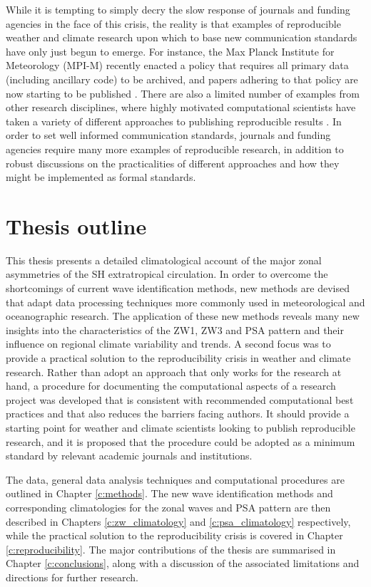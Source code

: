 While it is tempting to simply decry the slow response of journals and funding agencies in the face of this crisis, the reality is that examples of reproducible weather and climate research upon which to base new communication standards have only just begun to emerge. For instance, the Max Planck Institute for Meteorology (MPI-M) recently enacted a policy \citep{Stevens2015a} that requires all primary data (including ancillary code) to be archived, and papers adhering to that policy are now starting to be published \citep[e.g.][]{Stevens2015}. There are also a limited number of examples from other research disciplines, where highly motivated computational scientists have taken a variety of different approaches to publishing reproducible results \citep[e.g.][]{Hanigan2012,Ketcheson2012,Crooks2014,Bremges2015,Schmitt2015}. In order to set well informed communication standards, journals and funding agencies require many more examples of reproducible research, in addition to robust discussions on the practicalities of different approaches and how they might be implemented as formal standards.  



\section{Thesis outline}

This thesis presents a detailed climatological account of the major zonal asymmetries of the SH extratropical circulation. In order to overcome the shortcomings of current wave identification methods, new methods are devised that adapt data processing techniques more commonly used in meteorological and oceanographic research. The application of these new methods reveals many new insights into the characteristics of the ZW1, ZW3 and PSA pattern and their influence on regional climate variability and trends. A second focus was to provide a practical solution to the reproducibility crisis in weather and climate research. Rather than adopt an approach that only works for the research at hand, a procedure for documenting the computational aspects of a research project was developed that is consistent with recommended computational best practices and that also reduces the barriers facing authors. It should provide a starting point for weather and climate scientists looking to publish reproducible research, and it is proposed that the procedure could be adopted as a minimum standard by relevant academic journals and institutions.

The data, general data analysis techniques and computational procedures are outlined in Chapter \ref{c:methods}. The new wave identification methods and corresponding climatologies for the zonal waves and PSA pattern are then described in Chapters \ref{c:zw_climatology} and \ref{c:psa_climatology} respectively, while the practical solution to the reproducibility crisis is covered in Chapter \ref{c:reproducibility}. The major contributions of the thesis are summarised in Chapter \ref{c:conclusions}, along with a discussion of the associated limitations and directions for further research.